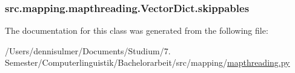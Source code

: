 \subsubsection[{\texorpdfstring{skippables}{skippables}}]{\setlength{\rightskip}{0pt plus 5cm}src.\+mapping.\+mapthreading.\+Vector\+Dict.\+skippables}\hypertarget{classsrc_1_1mapping_1_1mapthreading_1_1_vector_dict_a6f71fefdbf2c8c31e99190ddd408f558}{}\label{classsrc_1_1mapping_1_1mapthreading_1_1_vector_dict_a6f71fefdbf2c8c31e99190ddd408f558}


The documentation for this class was generated from the following file\+:\begin{DoxyCompactItemize}
\item 
/\+Users/dennisulmer/\+Documents/\+Studium/7. Semester/\+Computerlinguistik/\+Bachelorarbeit/src/mapping/\hyperlink{mapthreading_8py}{mapthreading.\+py}\end{DoxyCompactItemize}
